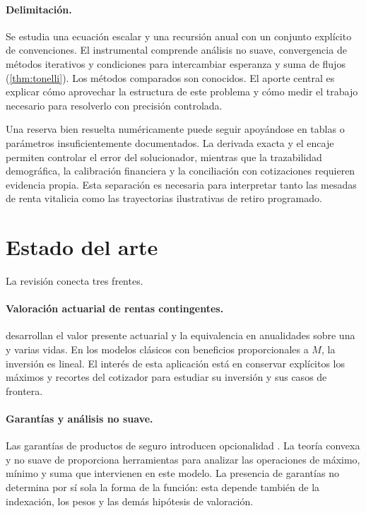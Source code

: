 \paragraph{Delimitación.}
Se estudia una ecuación escalar y una recursión anual con un conjunto explícito de
convenciones. El instrumental comprende análisis no suave, convergencia de
métodos iterativos y condiciones para intercambiar esperanza y suma de flujos
(\cref{thm:tonelli}). Los \datoNMetodos{} métodos comparados son conocidos. El
aporte central es explicar cómo aprovechar la estructura de este problema y cómo
medir el trabajo necesario para resolverlo con precisión controlada.

\begin{criticism}
Una reserva bien resuelta numéricamente puede seguir apoyándose en tablas o
parámetros insuficientemente documentados. La derivada exacta y el encaje permiten
controlar el error del solucionador, mientras que la trazabilidad demográfica,
la calibración financiera y la conciliación con cotizaciones requieren evidencia
propia. Esta separación es necesaria para interpretar tanto las mesadas de renta
vitalicia como las trayectorias ilustrativas de retiro programado.
\end{criticism}

\section{Estado del arte}
\label{sec:estado-arte}

La revisión conecta tres frentes.

\paragraph{Valoración actuarial de rentas contingentes.}
\citet{bowers1997,dickson2020,gerber1997,promislow2015} desarrollan el valor
presente actuarial y la equivalencia en anualidades sobre una y varias vidas. En
los modelos clásicos con beneficios proporcionales a $M$, la inversión es lineal.
El interés de esta aplicación está en conservar explícitos los máximos y recortes
del cotizador para estudiar su inversión y sus casos de frontera.

\paragraph{Garantías y análisis no suave.}
Las garantías de productos de seguro introducen opcionalidad
\citep[cap.~11]{dickson2020}. La teoría convexa y no suave de
\citet{rockafellar1970,boyd2004,clarke1983} proporciona herramientas para
analizar las operaciones de máximo, mínimo y suma que intervienen en este modelo.
La presencia de garantías no determina por sí sola la forma de la función: esta
depende también de la indexación, los pesos y las demás hipótesis de valoración.

